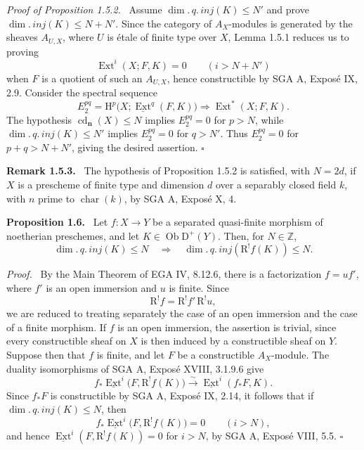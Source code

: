 \documentclass[12pt]{article}
\newcommand{\ZZ}{\mathbb Z}
\newcommand{\Ext}{\operatorname{Ext}}
\newcommand{\cd}{\operatorname{cd}}
\newcommand{\ob}{\operatorname{Ob}}
\newcommand{\D}{\mathrm D}
\newcommand{\R}{\mathrm R}
\newcommand{\Hh}{\mathrm H}
\newcommand{\qedtext}{\hfill$\square$}
\newenvironment{statement}[1]{\par\medskip\noindent\textbf{#1.}\ }{\par\medskip}
\newenvironment{prooftext}[1][Proof]{\par\noindent\emph{#1.}\ }{\par\medskip}
\begin{document}
\begin{prooftext}[Proof of Proposition 1.5.2]
Assume $\dim.\,q.\,inj(K)\le N'$ and prove $\dim.\,inj(K)\le N+N'$. Since the category of $A_X$-modules is generated by the sheaves $A_{U,X}$, where $U$ is étale of finite type over $X$, Lemma 1.5.1 reduces us to proving
\[
   \Ext^i(X;F,K)=0\qquad(i>N+N')
\]
when $F$ is a quotient of such an $A_{U,X}$, hence constructible by SGA A, Exposé IX, 2.9. Consider the spectral sequence
\[
   E_2^{pq}=\Hh^p\bigl(X;\underline{\Ext}^{q}(F,K)\bigr)\Rightarrow\Ext^*(X;F,K).
\]
The hypothesis $\cd_{\mathbf n}(X)\le N$ implies $E_2^{pq}=0$ for $p>N$, while $\dim.\,q.\,inj(K)\le N'$ implies $E_2^{pq}=0$ for $q>N'$. Thus $E_2^{pq}=0$ for $p+q>N+N'$, giving the desired assertion. \qedtext
\end{prooftext}

\begin{statement}{Remark 1.5.3}
The hypothesis of Proposition 1.5.2 is satisfied, with $N=2d$, if $X$ is a prescheme of finite type and dimension $d$ over a separably closed field $k$, with $n$ prime to $\operatorname{char}(k)$, by SGA A, Exposé X, 4.
\end{statement}

\begin{statement}{Proposition 1.6}
Let $f:X\to Y$ be a separated quasi-finite morphism of noetherian preschemes, and let $K\in\ob\D^+(Y)$. Then, for $N\in\ZZ$,
\[
   \dim.\,q.\,inj(K)\le N\quad\Longrightarrow\quad
   \dim.\,q.\,inj(\R^!f(K))\le N.
\]
\end{statement}

\begin{prooftext}
By the Main Theorem of EGA IV, 8.12.6, there is a factorization $f=uf'$, where $f'$ is an open immersion and $u$ is finite. Since
\[
   \R^!f=\R^!f'\,\R^!u,
\]
we are reduced to treating separately the case of an open immersion and the case of a finite morphism. If $f$ is an open immersion, the assertion is trivial, since every constructible sheaf on $X$ is then induced by a constructible sheaf on $Y$. Suppose then that $f$ is finite, and let $F$ be a constructible $A_X$-module. The duality isomorphisms of SGA A, Exposé XVIII, 3.1.9.6 give
\[
   f_*\underline{\Ext}^i\bigl(F,\R^!f(K)\bigr)\xrightarrow{\sim}\underline{\Ext}^{i}(f_*F,K).
\]
Since $f_*F$ is constructible by SGA A, Exposé IX, 2.14, it follows that if $\dim.\,q.\,inj(K)\le N$, then
\[
   f_*\underline{\Ext}^i\bigl(F,\R^!f(K)\bigr)=0\qquad(i>N),
\]
and hence $\underline{\Ext}^i(F,\R^!f(K))=0$ for $i>N$, by SGA A, Exposé VIII, 5.5. \qedtext
\end{prooftext}
\end{document}
